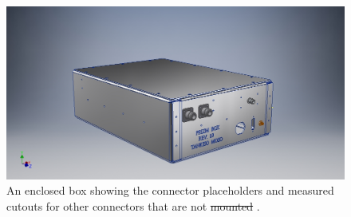 \begin{figure}
	\centering
	\includegraphics[width=0.7\linewidth]{Figures/Enclosed}
	\caption{An enclosed box showing the connector placeholders and measured cutouts for other connectors that are not \st{mounted} .  }
	\label{Fig:Enclosed}
\end{figure}
